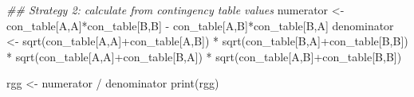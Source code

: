 \documentclass[
  letterpaper,
  DIV=11,
  numbers=noendperiod]{scrreprt}
\newenvironment{Shaded}{\begin{snugshade}}{\end{snugshade}}
\newcommand{\DocumentationTok}[1]{\textcolor[rgb]{0.37,0.37,0.37}{\textit{#1}}}
\newcommand{\FunctionTok}[1]{\textcolor[rgb]{0.28,0.35,0.67}{#1}}
\newcommand{\NormalTok}[1]{\textcolor[rgb]{0.00,0.23,0.31}{#1}}
\newcommand{\OtherTok}[1]{\textcolor[rgb]{0.00,0.23,0.31}{#1}}
\newcommand{\SpecialCharTok}[1]{\textcolor[rgb]{0.37,0.37,0.37}{#1}}
\newcommand{\StringTok}[1]{\textcolor[rgb]{0.13,0.47,0.30}{#1}}
\begin{document}
\begin{Shaded}
\begin{Highlighting}[]
\DocumentationTok{\#\# Strategy 2: calculate from contingency table values}
\NormalTok{numerator }\OtherTok{\textless{}{-}}\NormalTok{ con\_table[}\StringTok{\textquotesingle{}A\textquotesingle{}}\NormalTok{,}\StringTok{\textquotesingle{}A\textquotesingle{}}\NormalTok{]}\SpecialCharTok{*}\NormalTok{con\_table[}\StringTok{\textquotesingle{}B\textquotesingle{}}\NormalTok{,}\StringTok{\textquotesingle{}B\textquotesingle{}}\NormalTok{] }\SpecialCharTok{{-}}\NormalTok{ con\_table[}\StringTok{\textquotesingle{}A\textquotesingle{}}\NormalTok{,}\StringTok{\textquotesingle{}B\textquotesingle{}}\NormalTok{]}\SpecialCharTok{*}\NormalTok{con\_table[}\StringTok{\textquotesingle{}B\textquotesingle{}}\NormalTok{,}\StringTok{\textquotesingle{}A\textquotesingle{}}\NormalTok{]}
\NormalTok{denominator }\OtherTok{\textless{}{-}} \FunctionTok{sqrt}\NormalTok{(con\_table[}\StringTok{\textquotesingle{}A\textquotesingle{}}\NormalTok{,}\StringTok{\textquotesingle{}A\textquotesingle{}}\NormalTok{]}\SpecialCharTok{+}\NormalTok{con\_table[}\StringTok{\textquotesingle{}A\textquotesingle{}}\NormalTok{,}\StringTok{\textquotesingle{}B\textquotesingle{}}\NormalTok{]) }\SpecialCharTok{*}
               \FunctionTok{sqrt}\NormalTok{(con\_table[}\StringTok{\textquotesingle{}B\textquotesingle{}}\NormalTok{,}\StringTok{\textquotesingle{}A\textquotesingle{}}\NormalTok{]}\SpecialCharTok{+}\NormalTok{con\_table[}\StringTok{\textquotesingle{}B\textquotesingle{}}\NormalTok{,}\StringTok{\textquotesingle{}B\textquotesingle{}}\NormalTok{]) }\SpecialCharTok{*} 
               \FunctionTok{sqrt}\NormalTok{(con\_table[}\StringTok{\textquotesingle{}A\textquotesingle{}}\NormalTok{,}\StringTok{\textquotesingle{}A\textquotesingle{}}\NormalTok{]}\SpecialCharTok{+}\NormalTok{con\_table[}\StringTok{\textquotesingle{}B\textquotesingle{}}\NormalTok{,}\StringTok{\textquotesingle{}A\textquotesingle{}}\NormalTok{]) }\SpecialCharTok{*} 
               \FunctionTok{sqrt}\NormalTok{(con\_table[}\StringTok{\textquotesingle{}A\textquotesingle{}}\NormalTok{,}\StringTok{\textquotesingle{}B\textquotesingle{}}\NormalTok{]}\SpecialCharTok{+}\NormalTok{con\_table[}\StringTok{\textquotesingle{}B\textquotesingle{}}\NormalTok{,}\StringTok{\textquotesingle{}B\textquotesingle{}}\NormalTok{])}

\NormalTok{rgg }\OtherTok{\textless{}{-}}\NormalTok{ numerator }\SpecialCharTok{/}\NormalTok{ denominator}
\FunctionTok{print}\NormalTok{(rgg)}
\end{Highlighting}
\end{Shaded}
\end{document}
